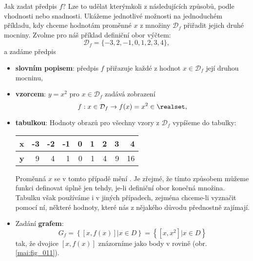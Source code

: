       Jak zadat předpis \(f\)? Lze to udělat kterýmkoli z následujících způsobů, podle vhodnosti
      nebo snadnosti. Ukážeme jednotlivé možnosti na jednoduchém příkladu, kdy chceme hodnotám 
      proměnné \(x\) z množiny \(\mathcal{D}_f\) přiřadit jejich druhé mocniny. Zvolme pro náš 
      příklad definiční obor výčtem:
      \begin{equation*}
         \mathcal{D}_f = \lbrace-3,2,-1,0,1,2,3,4\rbrace,
      \end{equation*}
      a zadáme předpis
      \begin{itemize}[noitemsep]
        \item \textbf{slovním popisem}: předpis \(f\) přiřazuje každé z hodnot \(x\in 
              \mathcal{D}_f\) její druhou mocninu,
        \item \textbf{vzorcem}: \(y = x^2\) pro \(x\in \mathcal{D}_f\) zadává zobrazení
              \begin{equation*}
                f: x\in \mathcal{D}_f \rightarrow f(x)= x^2\in\realset,
              \end{equation*}
        \item \textbf{tabulkou}: Hodnoty obrazů pro všechny vzory z \(\mathcal{D}_f\) vypíšeme do 
              tabulky:
              \begin{table}[ht!]
                \centering
                \begin{tabular}{c|rrrrrrrr}
                  \textbf{x} & -3 & -2 & -1 & 0 & 1 & 2 & 3 & 4  \\ \hline
                  \textbf{y} & 9  & 4  & 1  & 0 & 1 & 4 & 9 & 16
                \end{tabular}
              \end{table}
              Proměnná \(x\) se v tomto případě mění . Je zřejmé, že tímto způsobem 
              můžeme funkci definovat úplně jen tehdy, je-li definiční obor konečná množina. 
              Tabulku však používáme i v jiných případech, zejména chceme-li vyznačit pomocí ní, 
              některé hodnoty, které nás z nějakého důvodu přednostně zajímají. 
        \item Zadání \textbf{grafem}: 
          \begin{equation*}
            G_f = \left\lbrace\left[x,f(x)\right] \lvert x\in D\right\rbrace
                = \left\lbrace\left[x,x^2 \right] \lvert x\in D\right\rbrace
          \end{equation*}
          tak, že dvojice \([x, f(x)]\) znázorníme jako body v rovině (obr. \ref{mai:fig_011}).

\end{itemize}
